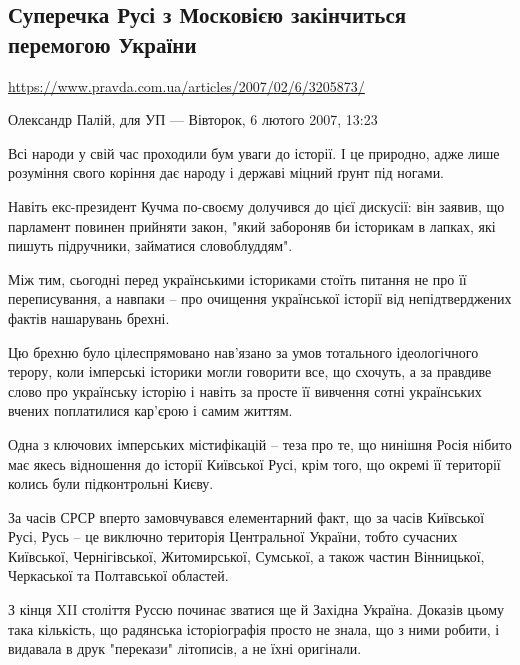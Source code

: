  
 

\subsection{Суперечка Русі з Московією закінчиться перемогою України}
\url{https://www.pravda.com.ua/articles/2007/02/6/3205873/}


Олександр Палій, для УП — Вівторок, 6 лютого 2007, 13:23

Всі народи у свій час проходили бум уваги до історії. І це природно, адже лише
розуміння свого коріння дає народу і державі міцний ґрунт під ногами.

Навіть екс-президент Кучма по-своєму долучився до цієї дискусії: він заявив, що
парламент повинен прийняти закон, "який забороняв би історикам в лапках, які
пишуть підручники, займатися словоблуддям".

Між тим, сьогодні перед українськими істориками стоїть питання не про її
переписування, а навпаки – про очищення української історії від непідтверджених
фактів нашарувань брехні.

Цю брехню було цілеспрямовано нав'язано за умов тотального ідеологічного
терору, коли імперські історики могли говорити все, що схочуть, а за правдиве
слово про українську історію і навіть за просте її вивчення сотні українських
вчених поплатилися кар'єрою і самим життям.

Одна з ключових імперських містифікацій – теза про те, що нинішня Росія нібито
має якесь відношення до історії Київської Русі, крім того, що окремі її
території колись були підконтрольні Києву.

За часів СРСР вперто замовчувався елементарний факт, що за часів Київської
Русі, Русь – це виключно територія Центральної України, тобто сучасних
Київської, Чернігівської, Житомирської, Сумської, а також частин Вінницької,
Черкаської та Полтавської областей.

З кінця XII століття Руссю починає зватися ще й Західна Україна. Доказів цьому
така кількість, що радянська історіографія просто не знала, що з ними робити, і
видавала в друк "перекази" літописів, а не їхні оригінали.

